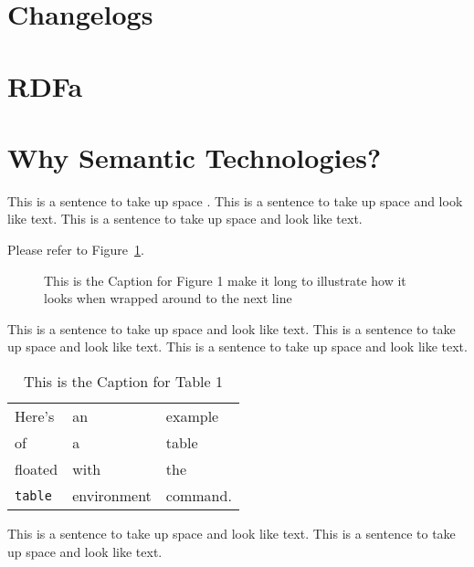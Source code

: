 \section{Changelogs}

\section{RDFa}

\section{Why Semantic Technologies?}

This is a sentence to take up space \cite{thisbook}.
This is a sentence to take up space and look like text.
This is a sentence to take up space and look like text.

Please refer to Figure~\ref{myfig}.  %

\begin{figure}
\centering
\vspace{2.0in} %
\caption{This is the Caption for Figure 1 make it long to illustrate
how it looks when wrapped around to the next line}
\label{myfig}  %
\end{figure}

This is a sentence to take up space and look like text.
This is a sentence to take up space and look like text.
This is a sentence to take up space and look like text.

\begin{table}
\caption[This is the Caption for Table 1]
            {This is the Caption for Table 1\cite{thisbook}}
\begin{center}
\begin{tabular}{lll}
Here's       & an          & example  \\
of           & a           & table    \\
floated      & with        & the      \\
\verb+table+ & environment & command.
\end{tabular}
\end{center}
\end{table}

This is a sentence to take up space and look like text.
This is a sentence to take up space and look like text.

